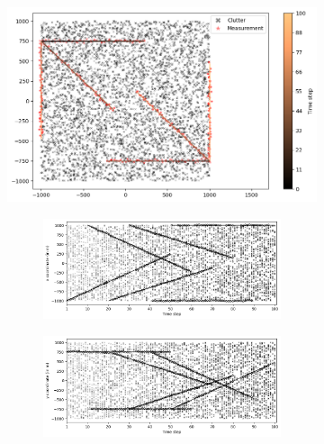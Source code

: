 \begin{figure}
    \centering
    \begin{subfigure}[]{0.48\linewidth}
        \centering
        \includegraphics[width=\linewidth]{figures/c2-tracks-measurements.png}
    \end{subfigure}
    \hfill
    \begin{subfigure}[]{0.48\linewidth}
        \centering
        \begin{subfigure}[t]{\linewidth}
            \includegraphics[width=\linewidth]{figures/c2-x-estimates.png}
        \end{subfigure}
        \vfill\par
        \begin{subfigure}[b]{\linewidth}
            \includegraphics[width=\linewidth]{figures/c2-y-estimates.png}

\end{subfigure}
\end{subfigure}
\end{figure}
